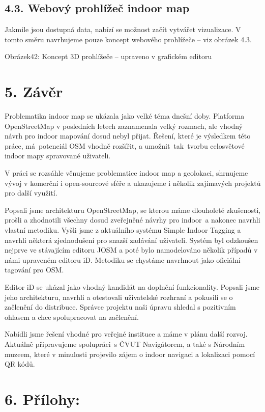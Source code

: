 \section{4.3. Webový prohlížeč indoor map}\label{webovuxfd-prohluxedux17eeux10d-indoor-map}

Jakmile jsou dostupná data, nabízí se možnost začít vytvářet vizualizace. V tomto směru navrhujeme pouze koncept webového prohlížeče -- viz obrázek 4.3.

Obrázek42: Koncept 3D prohlížeče -- upraveno v grafickém editoru

\chapter{5. Závěr}\label{zuxe1vux11br}

Problematika indoor map se ukázala jako velké téma dnešní doby. Platforma OpenStreetMap v posledních letech zaznamenala velký rozmach, ale vhodný návrh pro indoor mapování dosud nebyl přijat. Řešení, které je výsledkem této práce, má~potenciál OSM vhodně rozšířit, a umožnit~tak~tvorbu celosvětové indoor mapy spravované uživateli.

V práci se rozsáhle věnujeme problematice indoor map a geolokaci, shrnujeme vývoj v komerční i open-sourcové sféře a ukazujeme i několik zajímavých projektů pro další využití.

Popsali jsme architekturu OpenStreetMap, se kterou máme dlouholeté zkušenosti, prošli a zhodnotili všechny dosud zveřejněné návrhy pro indoor~a nakonec navrhli vlastní metodiku. Vyšli jsme z aktuálního systému Simple Indoor Tagging a navrhli některá zjednodušení pro snazší zadávání uživateli. Systém byl odzkoušen nejprve ve stávajícím editoru JOSM a poté bylo namodelováno několik případů v námi upraveném editoru iD. Metodiku se chystáme navrhnout jako oficiální tagování pro OSM.

Editor iD se ukázal jako vhodný kandidát na doplnění funkcionality. Popsali jsme jeho architekturu, navrhli a otestovali uživatelské rozhraní a pokusili se o začlenění do distribuce. Správce projektu naši úpravu shledal s pozitivním ohlasem a chce spolupracovat na začlenění.

Nabídli jsme řešení vhodné pro veřejné instituce a máme v plánu další rozvoj. Aktuálně připravujeme spolupráci~s ČVUT Navigátorem, a také s Národním muzeem, které v minulosti projevilo zájem o indoor navigaci a lokalizaci pomocí QR kódů.

\chapter{6. Přílohy:}\label{pux159uxedlohy}

